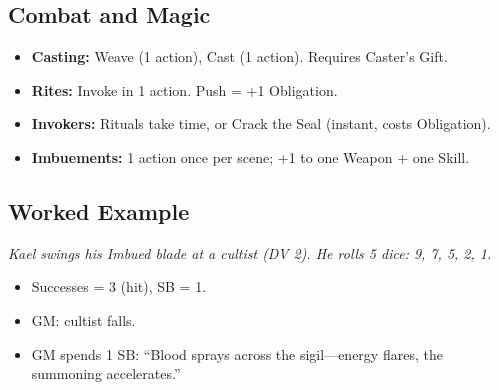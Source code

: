 \subsection{Combat and Magic}
\begin{itemize}
  \item \textbf{Casting:} Weave (1 action), Cast (1 action). Requires Caster’s Gift.
  \item \textbf{Rites:} Invoke in 1 action. Push = +1 Obligation.
  \item \textbf{Invokers:} Rituals take time, or Crack the Seal (instant, costs Obligation).
  \item \textbf{Imbuements:} 1 action once per scene; +1 to one Weapon + one Skill.
\end{itemize}

\subsection{Worked Example}
\emph{Kael swings his Imbued blade at a cultist (DV 2). He rolls 5 dice: 9, 7, 5, 2, 1.}
\begin{itemize}
  \item Successes = 3 (hit), SB = 1.
  \item GM: cultist falls.
  \item GM spends 1 SB: ``Blood sprays across the sigil—energy flares, the summoning accelerates.''
\end{itemize}
